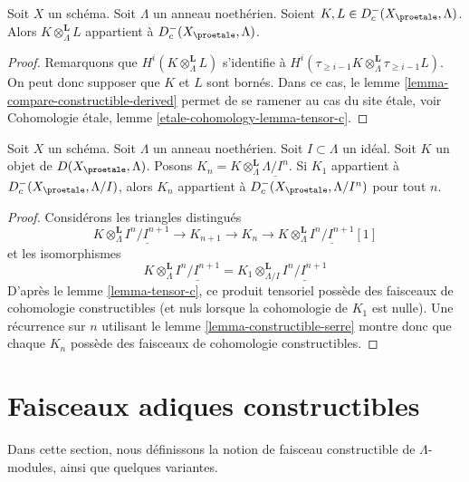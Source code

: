 \begin{lemma}
\label{lemma-tensor-c}
Soit $X$ un schéma. Soit $\Lambda$ un anneau noethérien.
Soient $K, L \in D_c^-(X_\proetale, \Lambda)$. Alors
$K \otimes_\Lambda^\mathbf{L} L$ appartient à $D_c^-(X_\proetale, \Lambda)$.
\end{lemma}

\begin{proof}
Remarquons que $H^i(K \otimes_\Lambda^\mathbf{L} L)$ s'identifie à
$H^i(\tau_{\geq i - 1}K \otimes_\Lambda^\mathbf{L} \tau_{\geq i - 1}L)$.
On peut donc supposer que $K$ et $L$ sont bornés.
Dans ce cas, le lemme \ref{lemma-compare-constructible-derived} permet de
se ramener au cas du site \'etale, voir
Cohomologie \'etale, lemme \ref{etale-cohomology-lemma-tensor-c}.
\end{proof}

\begin{lemma}
\label{lemma-compare-truncations-constructible}
Soit $X$ un schéma. Soit $\Lambda$ un anneau noethérien.
Soit $I \subset \Lambda$ un idéal.
Soit $K$ un objet de $D(X_\proetale, \Lambda)$.
Posons $K_n = K \otimes_\Lambda^\mathbf{L} \underline{\Lambda/I^n}$.
Si $K_1$ appartient à $D^-_c(X_\proetale, \Lambda/I)$, alors
$K_n$ appartient à $D^-_c(X_\proetale, \Lambda/I^n)$ pour tout $n$.
\end{lemma}

\begin{proof}
Considérons les triangles distingués
$$
K \otimes_\Lambda^\mathbf{L} \underline{I^n/I^{n + 1}} \to
K_{n + 1} \to
K_n \to
K \otimes_\Lambda^\mathbf{L} \underline{I^n/I^{n + 1}}[1]
$$
et les isomorphismes
$$
K \otimes_\Lambda^\mathbf{L} \underline{I^n/I^{n + 1}} =
K_1 \otimes_{\Lambda/I}^\mathbf{L} \underline{I^n/I^{n + 1}}
$$
D'après le lemme \ref{lemma-tensor-c}, ce produit tensoriel possède des
faisceaux de cohomologie constructibles (et nuls lorsque la cohomologie de $K_1$
est nulle). Une récurrence sur $n$ utilisant le
lemme \ref{lemma-constructible-serre}
montre donc que chaque $K_n$ possède des faisceaux de cohomologie constructibles.
\end{proof}








\section{Faisceaux adiques constructibles}
\label{section-adic}

\noindent
Dans cette section, nous définissons la notion de faisceau
constructible de $\Lambda$-modules, ainsi que quelques variantes.

